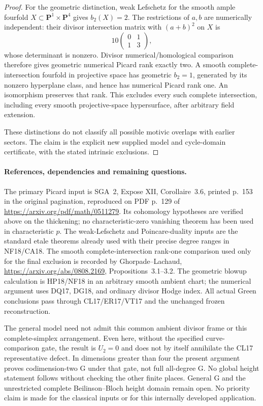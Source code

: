\begin{proof}
For the geometric distinction, weak Lefschetz for the smooth ample
fourfold $X\subset\mathbf P^1\times\mathbf P^4$ gives $b_2(X)=2$.
The restrictions of $a,b$ are numerically independent: their divisor
intersection matrix with $(a+b)^2$ on $X$ is
\[
                          10\begin{pmatrix}0&1\\1&3\end{pmatrix},
 \tag{PG18.22}\label{r18pg:Picard-matrix}
\]
whose determinant is nonzero.  Divisor numerical/homological
comparison therefore gives geometric numerical Picard rank exactly
two.  A smooth complete-intersection fourfold in projective space has
geometric $b_2=1$, generated by its nonzero hyperplane class, and hence
has numerical Picard rank one.  An isomorphism preserves that rank.
This excludes every such complete intersection, including every smooth
projective-space hypersurface, after arbitrary field extension.

These distinctions do not classify all possible motivic overlaps with
earlier sectors.  The claim is the explicit new supplied model and
cycle-domain certificate, with the stated intrinsic exclusions.
\end{proof}

\paragraph{References, dependencies and remaining questions.}
The primary Picard input is SGA~2, Expose XII, Corollaire~3.6,
printed p.~153 in the original pagination, reproduced on PDF p.~129
of \url{https://arxiv.org/pdf/math/0511279}.  Its cohomology hypotheses
are verified above on the thickening; no characteristic-zero vanishing
theorem has been used in characteristic $p$.
The weak-Lefschetz and Poincare-duality inputs are the standard etale
theorems already used with their precise degree ranges in NF18/CA18.
The smooth complete-intersection rank-one comparison used only for
the final exclusion is recorded by Ghorpade--Lachaud,
\url{https://arxiv.org/abs/0808.2169}, Propositions~3.1--3.2.
The geometric blowup calculation is HP18/NF18 in an arbitrary smooth
ambient chart; the numerical argument uses DQ17, DG18, and ordinary
divisor Hodge index.  All actual Green conclusions pass through
CL17/ER17/VT17 and the unchanged frozen reconstruction.

The general model need not admit this common ambient divisor frame
or this complete-simplex arrangement.  Even here, without the specified
curve-comparison gate, the result is $U_2=0$ and does not by itself
annihilate the CL17 representative defect.  In dimensions greater than
four the present argument proves codimension-two G under that gate,
not full all-degree G.  No global height statement follows without
checking the other finite places.  General G and the unrestricted
complete Beilinson--Bloch height domain remain open.  No priority claim
is made for the classical inputs or for this internally developed
application.
